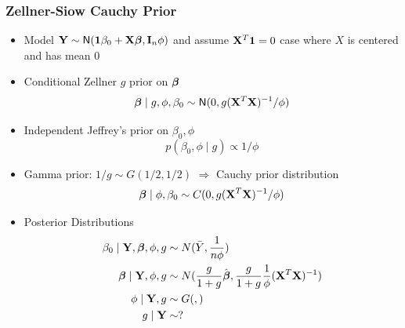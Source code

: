 \documentclass[handout]{beamer}\usepackage[]{graphicx}\usepackage[]{color}
\begin{document}
\begin{frame} \frametitle{Zellner-Siow Cauchy Prior}

\begin{itemize}
\item Model $\mathbf{Y} \sim \textsf{N}( \mathbf{1} \beta_0 + \mathbf{X} \boldsymbol{\beta} , \mathbf{I}_n\phi)$ and assume $\mathbf{X}^T\mathbf{1} = 0$  case where $X$ is centered and has mean 0 \pause
\item Conditional Zellner $g$ prior on $\boldsymbol{\beta}$
$$\boldsymbol{\beta} \mid g, \phi, \beta_0 \sim \textsf{N}(0, g (\mathbf{X}^T\mathbf{X})^{-1}/\phi)$$ \pause
\item Independent Jeffrey's prior on $\beta_0, \phi$
$$p(\beta_0, \phi \mid g) \propto 1/\phi$$ \pause

\item Gamma prior: $1/g \sim G(1/2, 1/2)$ $\Rightarrow$ Cauchy prior distribution
$$\boldsymbol{\beta} \mid  \phi, \beta_0 \sim C(0, g (\mathbf{X}^T\mathbf{X})^{-1}/\phi)$$
\pause
\item Posterior Distributions
\begin{align*}
\beta_0 \mid \mathbf{Y}, \boldsymbol{\beta}, \phi, g & \sim N(\bar{Y}, \frac{1}{n \phi}) \\
\boldsymbol{\beta} \mid \mathbf{Y}, \phi, g  & \sim N( \frac{g}{1+g} \hat{\boldsymbol{\beta}},  \frac{g}{1+g} \frac{1}{\phi} (\mathbf{X}^T\mathbf{X})^{-1} ) \\
\phi \mid \mathbf{Y}, g  & \sim G( , ) \\
g \mid \mathbf{Y} & \sim  ?
\end{align*}
\end{itemize}
\end{frame}
\end{document}
